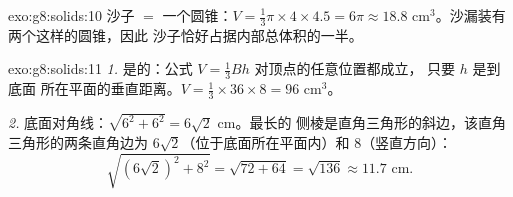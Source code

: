 \begin{solution}{exo:g8:solids:10}
沙子 $=$ 一个圆锥：$V = \frac13 \pi \times 4 \times 4.5 = 6\pi
\approx 18.8$ cm$^3$。沙漏装有两个这样的圆锥，因此
沙子恰好占据内部总体积的一半。
\end{solution}

\begin{solution}{exo:g8:solids:11}
\emph{1.} 是的：公式 $V = \frac13 Bh$ 对顶点的任意位置都成立，
只要 $h$ 是到底面
所在平面的垂直距离。$V = \frac13 \times 36 \times 8 = 96$ cm$^3$。

\emph{2.} 底面对角线：$\sqrt{6^2 + 6^2} = 6\sqrt2$ cm。最长的
侧棱是直角三角形的斜边，该直角三角形的两条直角边为
$6\sqrt2$（位于底面所在平面内）和 $8$（竖直方向）：
\[
\sqrt{(6\sqrt2)^2 + 8^2} = \sqrt{72 + 64} = \sqrt{136} \approx 11.7
\text{ cm}.
\]
\end{solution}

